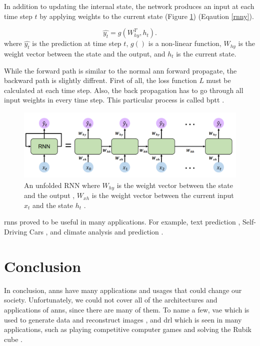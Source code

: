 \documentclass[runningheads]{llncs}
\begin{document}
In addition to updating the internal state, the network produces an input at each
time step $t$ by applying weights to the current state (Figure \ref{rnnf}) (Eqaution \ref{rnny}).

\begin{equation}
    \label{rnny}
    \hat{y_{t}} = g(W^T_{hy}, h_{t}).
\end{equation}
where $\hat{y_{t}}$ is the prediction at time step $t$, $g()$ is a non-linear function,
$W_{hy}$ is the weight vector between the state and the output, and $h_{t}$ is the current state.


While the forward path is similar to the normal \gls{ann} forward propagate, 
the backward path is slightly diffrent. First of all, the loss function $L$ must be calculated
at each time step. Also, the back propagation has to go through all input weights in 
every time step. This particular process is called \gls{bptt} \cite{werbos1990backpropagation}.

\begin{figure}[H]
    \label{rnnf}
    \centering
    \includegraphics[height=3.5cm]{rnn}
    \caption{An unfolded RNN where $W_{hy}$ is the weight vector between the state and the output 
    , $W_{xh}$ is the weight vector between the current input $x_{t}$ and the state $h_{t}$ \cite{mitlectwo}.}
\end{figure}

\gls{rnns} proved to be useful in many applications. For example, 
text prediction \cite{jagannatha2016structured}, Self-Driving Cars \cite{gu2020lstm}, and climate analysis and prediction \cite{earthnet}.


\section{Conclusion}

In conclusion, \gls{anns} have many applications and usages that 
could change our society.
Unfortunately, we could not cover all of the architectures and applications of \gls{anns},
since there are many of them. To name a few, \gls{vae} which is used to generate data and 
reconstruct images \cite{hou2017deep} \cite{yan2016attribute2image}, and 
\gls{drl} which is seen in many applications, such as playing competitive computer games \cite{berner2019dota} and solving the Rubik cube \cite{openairubikcube}.
\end{document}
